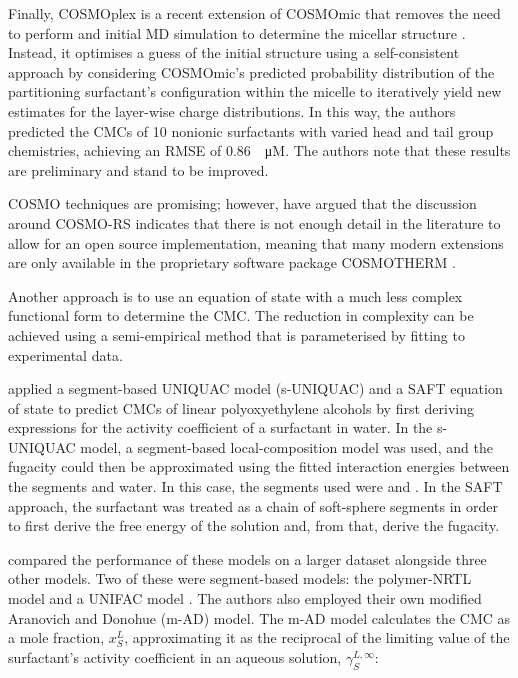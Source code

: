 Finally, COSMOplex is a recent extension of COSMOmic that removes the need to
perform and initial MD simulation to determine the micellar structure
\cite{klamtCOSMOplexSelfconsistentSimulation2019}. Instead, it optimises a guess
of the initial structure using a self-consistent approach by considering
COSMOmic's predicted probability distribution of the partitioning surfactant's
configuration within the micelle to iteratively yield new estimates for the
layer-wise charge distributions. In this way, the authors predicted the CMCs of
10 nonionic surfactants with varied head and tail group chemistries, achieving
an RMSE of \SI{0.86}{\log \micro M}. The authors note that these results are
preliminary and stand to be improved.

COSMO techniques are promising; however,
\citet{herbertDielectricContinuumMethods2021} have argued that the discussion
around COSMO-RS indicates that there is not enough detail in the literature to
allow for an open source implementation, meaning that many modern extensions are
only available in the proprietary software package \textsc{COSMOTHERM}
\cite{eckertFastSolventScreening2002}.

Another approach is to use an equation of state with a much less complex
functional form to determine the CMC. The reduction in complexity can be
achieved using a semi-empirical method that is parameterised by fitting to
experimental data.

\citet{liStudiesUNIQUACSAFT1998} applied a segment-based UNIQUAC model
(s-UNIQUAC) and a SAFT equation of state to predict CMCs of linear
polyoxyethylene alcohols by first deriving expressions for the activity
coefficient of a surfactant in water. In the s-UNIQUAC model, a segment-based
local-composition model was used, and the fugacity could then be approximated
using the fitted interaction energies between the segments and water. In this
case, the segments used were  and . In the SAFT approach, the
surfactant was treated as a chain of soft-sphere segments in order to first
derive the free energy of the solution and, from that, derive the fugacity.

\citet{chengCorrelationCriticalMicelle2005} compared the performance of these
models on a larger dataset alongside three other models. Two of these were
segment-based models: the polymer-NRTL model \cite{liStudiesUNIQUACSAFT1998} and
a UNIFAC model \cite{voutsasPredictionCriticalMicelle2001}. The authors also
employed their own modified Aranovich and Donohue (m-AD) model. The m-AD model
calculates the CMC as a mole fraction, $x_S^L$, approximating it as the
reciprocal of the limiting value of the surfactant's activity coefficient in an
aqueous solution, $\gamma_S^{L,\infty}$:

